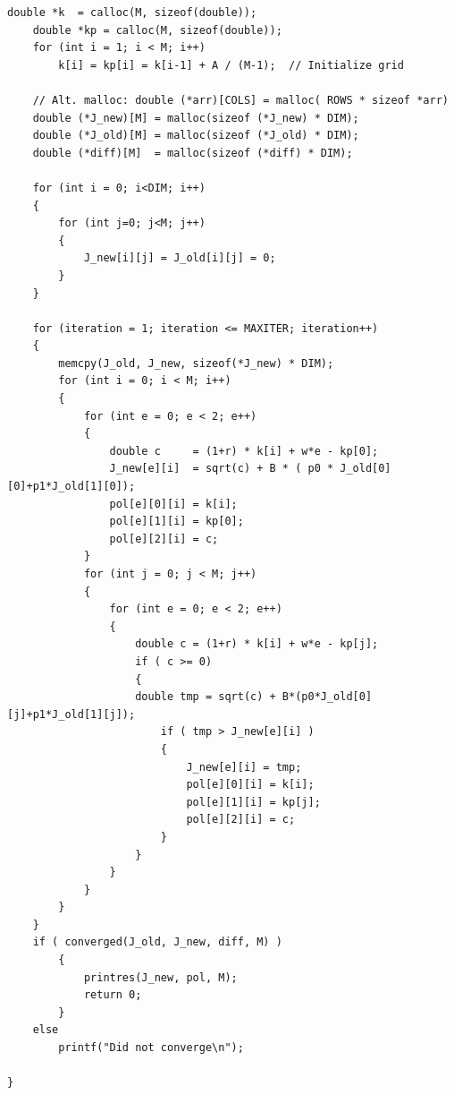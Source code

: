 \documentclass[12pt]{article}
\begin{document}
\begin{lstlisting}[caption=Original serial code, label={lst:LAppendix}]
    double *k  = calloc(M, sizeof(double));
    double *kp = calloc(M, sizeof(double));
    for (int i = 1; i < M; i++)
        k[i] = kp[i] = k[i-1] + A / (M-1);  // Initialize grid
     
    // Alt. malloc: double (*arr)[COLS] = malloc( ROWS * sizeof *arr)
    double (*J_new)[M] = malloc(sizeof (*J_new) * DIM);
    double (*J_old)[M] = malloc(sizeof (*J_old) * DIM);
    double (*diff)[M]  = malloc(sizeof (*diff) * DIM);
 
    for (int i = 0; i<DIM; i++)
    {
        for (int j=0; j<M; j++)
        {
            J_new[i][j] = J_old[i][j] = 0;
        }
    }
 
    for (iteration = 1; iteration <= MAXITER; iteration++)
    {
        memcpy(J_old, J_new, sizeof(*J_new) * DIM);
        for (int i = 0; i < M; i++)
        {
            for (int e = 0; e < 2; e++)
            {
                double c     = (1+r) * k[i] + w*e - kp[0];
                J_new[e][i]  = sqrt(c) + B * ( p0 * J_old[0][0]+p1*J_old[1][0]);
                pol[e][0][i] = k[i];
                pol[e][1][i] = kp[0];
                pol[e][2][i] = c;               
            }
            for (int j = 0; j < M; j++)
            {
                for (int e = 0; e < 2; e++)
                {
                    double c = (1+r) * k[i] + w*e - kp[j];
                    if ( c >= 0)
                    {
                    double tmp = sqrt(c) + B*(p0*J_old[0][j]+p1*J_old[1][j]);
                        if ( tmp > J_new[e][i] )
                        {
                            J_new[e][i] = tmp;
                            pol[e][0][i] = k[i];
                            pol[e][1][i] = kp[j];
                            pol[e][2][i] = c;
                        }
                    }
                }
            }
        }
    }
    if ( converged(J_old, J_new, diff, M) ) 
        {
            printres(J_new, pol, M);
            return 0;
        }
    else
        printf("Did not converge\n");
 
}
\end{lstlisting}
\end{document}
